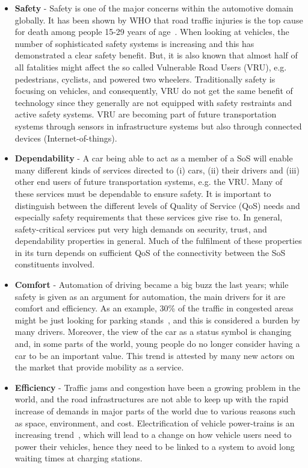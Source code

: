 \begin{itemize}
\item {\bf Safety} - Safety is one of the major concerns within the automotive domain globally. It has been shown by WHO that road traffic injuries is the top cause for death among people 15-29 years of age~\cite{WHO2015}. When looking at vehicles, the number of sophisticated safety systems is increasing and this has demonstrated a clear safety benefit. But, it is also known that almost half of all fatalities might affect the so called Vulnerable Road Users (VRU), e.g. pedestrians, cyclists, and powered two wheelers. Traditionally safety is focusing on vehicles, and consequently,  VRU do not get the same benefit of technology since they generally are not equipped with safety restraints and active safety systems. VRU are becoming part of future transportation systems through sensors in infrastructure systems but also through connected devices (Internet-of-things).

\item {\bf Dependability} - A car being able to act as a member of a SoS will enable many different kinds of services directed to (i) cars, (ii) their drivers and (iii) other end users of future transportation systems, e.g. the VRU. Many of these services must be dependable to ensure safety. It is important to distinguish between the different levels of Quality of Service (QoS) needs and especially safety requirements that these services give rise to. In general, safety-critical services put very high demands on security, trust, and dependability properties in general. Much of the fulfilment of these properties in its turn depends on sufficient QoS of the connectivity between the SoS constituents involved.
 
\item {\bf Comfort} - Automation of driving became a big buzz the last years; while safety is given as an argument for automation, the main drivers for it are comfort and efficiency. As an example, 30\% of the traffic in congested areas might be just looking for parking stands~\cite{Shoup2011thc}, and this is considered a burden by many drivers. Moreover, the view of the car as a status symbol is changing and, in some parts of the world, young people do no longer consider having a car to be an important value. This trend is attested by many new actors on the market that provide mobility as a service.
 
\item {\bf Efficiency} - Traffic jams and congestion have been a growing problem in the world, and the road infrastructures are not able to keep up with the rapid increase of demands in major parts of the world due to various reasons such as space, environment, and cost. Electrification of vehicle power-trains is an increasing trend~\cite{KPMG}, which will lead to a change on how vehicle users need to power their vehicles, hence they need to be linked to a system to avoid long waiting times at charging stations.
 

\end{itemize}
